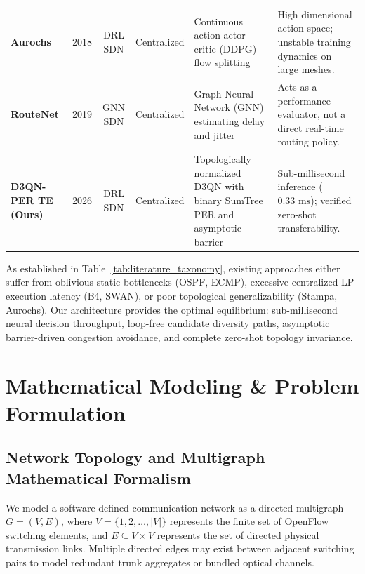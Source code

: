 \documentclass[12pt,a4paper,oneside]{report}
\begin{document}
\begin{table}[htbp]
\begin{tabularx}{\textwidth}{l c c c p{4.2cm} X}
\addlinespace
\textbf{Aurochs} \cite{chen2018aurochs} & 2018 & DRL SDN & Centralized & Continuous action actor-critic (DDPG) flow splitting & High dimensional action space; unstable training dynamics on large meshes. \\
\addlinespace
\textbf{RouteNet} \cite{rusek2019routenet} & 2019 & GNN SDN & Centralized & Graph Neural Network (GNN) estimating delay and jitter & Acts as a performance evaluator, not a direct real-time routing policy. \\
\addlinespace
\textbf{D3QN-PER TE (Ours)} & 2026 & DRL SDN & Centralized & Topologically normalized D3QN with binary SumTree PER and asymptotic barrier & Sub-millisecond inference ($0.33\text{ ms}$); verified zero-shot transferability. \\
\bottomrule
\end{tabularx}
\end{table}

As established in Table~\ref{tab:literature_taxonomy}, existing approaches either suffer from oblivious static bottlenecks (OSPF, ECMP), excessive centralized LP execution latency (B4, SWAN), or poor topological generalizability (Stampa, Aurochs). Our architecture provides the optimal equilibrium: sub-millisecond neural decision throughput, loop-free candidate diversity paths, asymptotic barrier-driven congestion avoidance, and complete zero-shot topology invariance.


\chapter{Mathematical Modeling \& Problem Formulation}
\label{chap:formulation}

\section{Network Topology and Multigraph Mathematical Formalism}
We model a software-defined communication network as a directed multigraph $G = (V, E)$, where $V = \{1, 2, \dots, |V|\}$ represents the finite set of OpenFlow switching elements, and $E \subseteq V \times V$ represents the set of directed physical transmission links. Multiple directed edges may exist between adjacent switching pairs to model redundant trunk aggregates or bundled optical channels.
\end{document}
